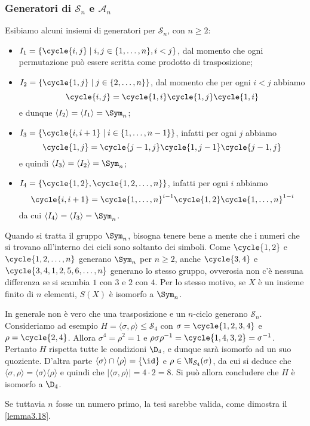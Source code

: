 \documentclass[11pt]{scrartcl}
\begin{document}
	\subsubsection{Generatori di \texorpdfstring{$\mathcal{S}_n$}{Sₙ} e \texorpdfstring{$\mathcal{A}_n$}{Aₙ}}
	
	Esibiamo alcuni insiemi di generatori per $\mathcal{S}_n$, con $n \geq 2$:
	
	\begin{itemize}
		\item $I_1 = \{\cycle{i, j} \mid i, j \in\{1, \ldots, n\}, i < j\}$, dal momento che
		ogni permutazione può essere scritta come prodotto di trasposizione;
		\item $I_2 = \{\cycle{1, j}\mid j \in \{2, \ldots, n\}\}$, dal momento che per ogni $i<j$ abbiamo
		\[
		\cycle{i, j} = \cycle{1, i}\cycle{1, j}\cycle{1, i}
		\]
		e dunque $\langle I_2 \rangle = \langle I_1 \rangle = \Sym_n$;
		\item $I_3 = \{\cycle{i, i + 1}\mid i \in\{1, \ldots, n - 1\}\}$,
		infatti per ogni $j$ abbiamo 
		\[
		\cycle{1, j} = \cycle{j - 1, j}\cycle{1, j - 1}\cycle{j - 1, j}
		\]
		e quindi $\langle I_3 \rangle = \langle I_2 \rangle = \Sym_n$;
		\item $I_4 = \{\cycle{1, 2}, \cycle{1, 2, \ldots, n}\}$, infatti per ogni
		$i$ abbiamo 
		\[
		\cycle{i, i + 1} = \cycle{1, \ldots, n}^{i - 1}\cycle{1, 2}\cycle{1, \ldots, n}^{1 - i}
		\]
		da cui $\langle I_4 \rangle = \langle I_3 \rangle = \Sym_n$.
	\end{itemize}
	
	\begin{remark}
		Quando si tratta il gruppo $\Sym_n$, bisogna tenere bene a mente che i numeri
		che si trovano all'interno dei cicli sono soltanto dei simboli. Come
		$\cycle{1, 2}$ e $\cycle{1, 2, \ldots, n}$ generano $\Sym_n$ per $n \geq 2$,
		anche $\cycle{3, 4}$ e $\cycle{3, 4, 1, 2, 5, 6, \ldots, n}$ generano lo stesso gruppo,
		ovverosia non c'è nessuna differenza se si scambia $1$ con $3$ e $2$ con $4$.
		Per lo stesso motivo, se $X$ è un insieme finito di $n$ elementi, $S(X)$ è
		isomorfo a $\Sym_n$.
	\end{remark}
	
	\begin{remark}
		In generale non è vero che una trasposizione e un $n$-ciclo generano $\mathcal{S}_n$.
		Consideriamo ad esempio $H = \langle\sigma, \rho\rangle\leqslant \mathcal{S}_4$ con
		$\sigma = \cycle{1, 2, 3, 4}$ e $\rho = \cycle{2, 4}$. Allora
		$\sigma^4 = \rho^2 = 1$ e $\rho\sigma\rho^{-1} = \cycle{1, 4, 3, 2} =
		\sigma^{-1}$. Pertanto $H$ rispetta tutte le condizioni $\D_4$, e dunque sarà
		isomorfo ad un suo quoziente. D'altra parte $\langle\sigma\rangle\cap \langle\rho\rangle = \{\id\}$
		e $\rho \in \N_{\mathcal{S}_4}(\sigma)$, da cui si deduce che $\langle\sigma, \rho\rangle =
		\langle\sigma\rangle\langle\rho\rangle$ e quindi che $\lvert \langle\sigma, \rho\rangle\rvert = 4 \cdot 2 = 8$. Si può allora concludere che
		$H$ è isomorfo a $\D_4$. \medskip
		
		
		Se tuttavia $n$ fosse un numero primo, la tesi sarebbe valida, come dimostra il
		\autoref{lemma3.18}. 
	\end{remark}
\end{document}
